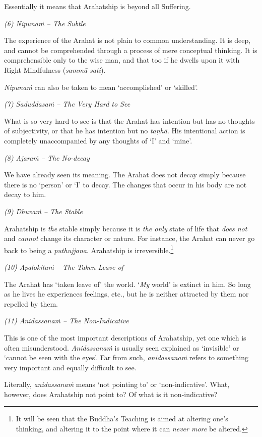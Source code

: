 \protect\hypertarget{beyond}{}{}Essentially it means that Arahatship is beyond all Suffering.

\emph{(6) Nipunaṁ -- The Subtle}

The experience of the Arahat is not plain to common understanding. It is deep, and cannot be comprehended through a process of mere conceptual thinking. It is comprehensible only to the wise man, and that too if he dwells upon it with Right Mindfulness (\textit{sammā sati}).

\textit{Nipunaṁ} can also be taken to mean `accomplished' or `skilled'.

\emph{(7) Saduddasaṁ -- The Very Hard to See}

What is so very hard to see is that the Arahat has intention but has no thoughts of subjectivity, or that he has intention but no \textit{taṇhā}. His intentional action is completely unaccompanied by any thoughts of `I' and `mine'.

\emph{(8) Ajaraṁ -- The No-decay}

We have already seen its meaning. The Arahat does not decay simply because there is no `person' or `I' to decay. The changes that occur in his body are not decay to him.

\emph{(9) Dhuvaṁ -- The Stable}

Arahatship is \emph{the} stable simply because it is \emph{the only} state of life that \emph{does not} and \emph{cannot} change its character or nature. For instance, the Arahat can never go back to being a \textit{puthujjana}. Arahatship is irreversible.\footnote{It will be seen that the Buddha's Teaching is aimed at altering one's thinking, and altering it to the point where it can \emph{never more} be altered.}

\emph{(10) Apalokitaṁ -- The Taken Leave of}

The Arahat has `taken leave of' the world. `\emph{My} world' is extinct in him. So long as he lives he experiences feelings, etc., but he is neither attracted by them nor repelled by them.

\emph{(11) Anidassanaṁ -- The Non-Indicative}

This is one of the most important descriptions of Arahatship, yet one which is often misunderstood. \textit{Anidassanaṁ} is usually seen explained as `invisible' or `cannot be seen with the eyes'. Far from such, \textit{anidassanaṁ} refers to something very important and equally difficult to see.

Literally, \textit{anidassanaṁ} means `not pointing to' or `non-indicative'. What, however, does Arahatship not point to? Of what is it non-indicative?

